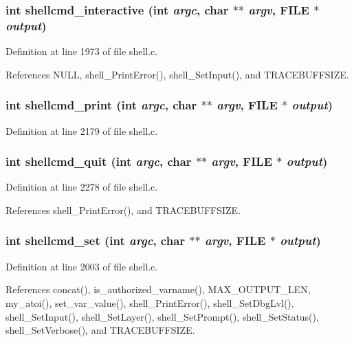 \subsubsection{\setlength{\rightskip}{0pt plus 5cm}int shellcmd\_\-interactive (int {\em argc}, char $\ast$$\ast$ {\em argv}, FILE $\ast$ {\em output})}\label{shell_8c_a46}




Definition at line 1973 of file shell.c.

References NULL, shell\_\-Print\-Error(), shell\_\-Set\-Input(), and TRACEBUFFSIZE.
\subsubsection{\setlength{\rightskip}{0pt plus 5cm}int shellcmd\_\-print (int {\em argc}, char $\ast$$\ast$ {\em argv}, FILE $\ast$ {\em output})}\label{shell_8c_a49}




Definition at line 2179 of file shell.c.
\subsubsection{\setlength{\rightskip}{0pt plus 5cm}int shellcmd\_\-quit (int {\em argc}, char $\ast$$\ast$ {\em argv}, FILE $\ast$ {\em output})}\label{shell_8c_a52}




Definition at line 2278 of file shell.c.

References shell\_\-Print\-Error(), and TRACEBUFFSIZE.
\subsubsection{\setlength{\rightskip}{0pt plus 5cm}int shellcmd\_\-set (int {\em argc}, char $\ast$$\ast$ {\em argv}, FILE $\ast$ {\em output})}\label{shell_8c_a47}




Definition at line 2003 of file shell.c.

References concat(), is\_\-authorized\_\-varname(), MAX\_\-OUTPUT\_\-LEN, my\_\-atoi(), set\_\-var\_\-value(), shell\_\-Print\-Error(), shell\_\-Set\-Dbg\-Lvl(), shell\_\-Set\-Input(), shell\_\-Set\-Layer(), shell\_\-Set\-Prompt(), shell\_\-Set\-Status(), shell\_\-Set\-Verbose(), and TRACEBUFFSIZE.
